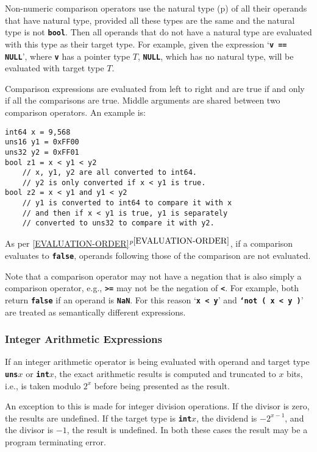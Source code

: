 \documentclass[12pt]{article}
\newcommand{\TT}[1]{{\tt \bfseries #1}}
\newcommand{\itemref}[1]{\ref{#1}$^{p\pageref{#1}}$}
\newcommand{\pagref}[1]{p\pageref{#1}}
\newenvironment{indpar}[1][0.3in]%
	{\begin{list}{}%
		     {\setlength{\itemsep}{0in}%
		      \setlength{\topsep}{0in}%
		      \setlength{\parsep}{1ex}%
		      \setlength{\labelwidth}{#1}%
		      \setlength{\leftmargin}{#1}%
		      \addtolength{\leftmargin}{\labelsep}}%
	 \item}%
	{\end{list}}
\begin{document}
Non-numeric comparison operators use the
natural type (\pagref{NATURAL-TYPE}) of all their operands that
have natural type, provided all these types are the same and
the natural type is not \TT{bool}.  Then all operands that do
not have a natural type are evaluated with this type as their
target type.
For example, given the expression `\TT{v == NULL}', where \TT{v}
has a pointer type $T$, \TT{NULL}, which has no natural type, will be
evaluated with target type $T$.

Comparison expressions are evaluated from left to right and are
true if and only if all the comparisons are true.  Middle
arguments are shared between two comparison operators.
An example is:

\begin{indpar}\begin{verbatim}
int64 x = 9,568
uns16 y1 = 0xFF00
uns32 y2 = 0xFF01
bool z1 = x < y1 < y2
    // x, y1, y2 are all converted to int64.
    // y2 is only converted if x < y1 is true.
bool z2 = x < y1 and y1 < y2
    // y1 is converted to int64 to compare it with x
    // and then if x < y1 is true, y1 is separately
    // converted to uns32 to compare it with y2.
\end{verbatim}\end{indpar}

As per \itemref{EVALUATION-ORDER}, if a comparison evaluates
to \TT{false}, operands following those of the comparison
are not evaluated.

Note that a comparison operator may not have a negation that is
also simply a comparison operator, e.g., \TT{>=} may not be the
negation of \TT{<}.  For example, both return \TT{false} if an
operand is \TT{NaN}.  For this reason `\TT{x < y}' and
\TT{`not ( x < y )}' are treated as semantically different
expressions.

\subsubsection{Integer Arithmetic Expressions}

If an integer arithmetic operator is being evaluated with
operand and target type \TT{uns$x$} or \TT{int$x$}, the
exact arithmetic results is computed and truncated to
$x$ bits, i.e., is taken modulo $2^x$ before being presented
as the result.

An exception to this is made for integer division operations.
If the divisor is zero, the results are undefined.  If the
target type is \TT{int$x$}, the dividend is $-2^{x-1}$, and
the divisor is $-1$, the result is undefined.  In both these
cases the result may be a program terminating error.
\end{document}
